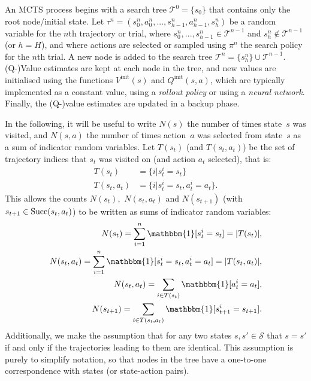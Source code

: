 \documentclass{article}
\newcommand{\cl}[1]{\mathcal{#1}}
\newcommand{\succc}[2]{\textnormal{Succ}(#1,#2)}
\newcommand{\one}{\mathbbm{1}}
\theoremstyle{plain}
\begin{document}
\begin{appendices}
        An MCTS process begins with a search tree $\mathcal{T}^0=\{s_0\}$ that contains only the root node/initial state. Let $\tau^n=(s_0^n,a_0^n,...,s_{h-1}^n,a_{h-1}^n,s_{h}^n)$ be a random variable for the $n$th trajectory or trial, where $s_0^n,...,s_{h-1}^n\in\mathcal{T}^{n-1}$ and $s_h^n\not\in\mathcal{T}^{n-1}$ (or $h=H$), and where actions are selected or sampled using $\pi^n$ the search policy for the $n$th trial. A new node is added to the search tree $\mathcal{T}^n=\{s_h^n\}\cup\mathcal{T}^{n-1}$. (Q-)Value estimates are kept at each node in the tree, and new values are initialised using the functions $V^{\text{init}}(s)$ and $Q^{\text{init}}(s,a)$, which are typically implemented as a constant value, using a \textit{rollout policy} or using a \textit{neural network}. Finally, the (Q-)value estimates are updated in a backup phase.
        
        In the following, it will be useful to write $N(s)$ the number of times state~$s$ was visited, and $N(s,a)$ the number of times action~$a$ was selected from state~$s$ as a sum of indicator random variables. Let $T(s_t)$ (and $T(s_t,a_t)$) be the set of trajectory indices that $s_t$ was visited on (and action $a_t$ selected), that is:
        \begin{align}
            T(s_t) &= \{i | s^i_t = s_t \} \\
            T(s_t,a_t) &= \{i | s^i_t = s_t, a^i_t = a_t \}.
        \end{align}
        This allows the counts $N(s_t),$ $N(s_t,a_t)$ and $N(s_{t+1})$ (with $s_{t+1}\in\succc{s_t}{a_t}$) to be written as sums of indicator random variables:
        \begin{align}
            N(s_t) = \sum_{i=1}^n \one[s^i_t=s_t] = |T(s_t)|, \\
            N(s_t,a_t) = \sum_{i=1}^n \one[s^i_t=s_t,a^i_t=a_t] = |T(s_t,a_t)|, \\ 
            N(s_t,a_t) = \sum_{i\in T(s_t)} \one[a^i_t = a_t], \label{appeq:nsa_sum} \\
            N(s_{t+1}) = \sum_{i\in T(s_t,a_t)} \one[s^i_{t+1} = s_{t+1}]. \label{appeq:ns_sum}
        \end{align}
        Additionally, we make the assumption that for any two states $s,s'\in\cl{S}$ that $s=s'$ if and only if the trajectories leading to them are identical. This assumption is purely to simplify notation, so that nodes in the tree have a one-to-one correspondence with states (or state-action pairs). 
        

\end{appendices}
\end{document}
